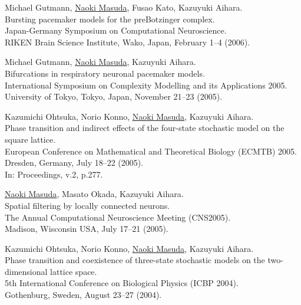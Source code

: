 \documentclass[11pt,letter]{article}
\begin{document}
\begin{etaremune}
\item Michael Gutmann, \underline{Naoki Masuda}, Fusao Kato, Kazuyuki Aihara.\\
Bursting pacemaker models for the preBotzinger complex.\\
Japan-Germany Symposium on Computational Neuroscience.\\
RIKEN Brain Science Institute, Wako, Japan, February 1--4 (2006).

\item Michael Gutmann, \underline{Naoki Masuda}, Kazuyuki Aihara.\\
Bifurcations in respiratory neuronal pacemaker models.\\
International Symposium on Complexity Modelling and its Applications 2005.\\
University of Tokyo, Tokyo, Japan, November 21--23 (2005).


\item Kazumichi Ohtsuka, Norio Konno, \underline{Naoki Masuda}, Kazuyuki Aihara.\\
Phase transition and indirect effects of the four-state stochastic model on the square lattice.\\
European Conference on Mathematical and Theoretical Biology (ECMTB) 2005.\\
Dresden, Germany, July 18--22 (2005).\\
In: Proceedings, v.2, p.277.

\item \underline{Naoki Masuda}, Masato Okada, Kazuyuki Aihara.\\
Spatial filtering by locally connected neurons.\\
The Annual Computational Neuroscience Meeting (CNS2005).\\
Madison, Wisconsin USA, July 17--21 (2005).

\item Kazumichi Ohtsuka, Norio Konno, \underline{Naoki Masuda}, Kazuyuki Aihara.\\
Phase transition and coexistence of three-state stochastic models on the two-dimensional lattice space.\\
5th International Conference on Biological Physics (ICBP 2004).\\
Gothenburg, Sweden, August 23--27 (2004).


\end{etaremune}
\end{document}
